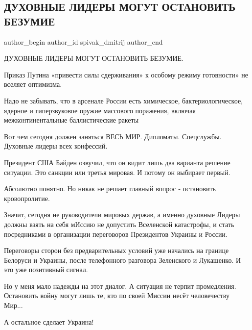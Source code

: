  
 
 
 
 
 
\subsection{ДУХОВНЫЕ ЛИДЕРЫ МОГУТ ОСТАНОВИТЬ БЕЗУМИЕ}
\label{sec:27_02_2022.fb.spivak_dmitrij.1.duhovnyje_lidery}
 
\ifcmt
 author_begin
   author_id spivak_dmitrij
 author_end
\fi

ДУХОВНЫЕ ЛИДЕРЫ МОГУТ ОСТАНОВИТЬ БЕЗУМИЕ. 

Приказ Путина «привести силы сдерживания» к особому режиму готовности» не
вселяет оптимизма. 

Надо не забывать, что в арсенале России есть химическое, бактериологическое,
ядерное и гиперзвуковое оружие массового поражения, включая межконтинентальные
баллистические ракеты 

Вот чем сегодня должен заняться ВЕСЬ МИР. Дипломаты. Спецслужбы. Духовные
лидеры всех конфессий. 

Президент США Байден озвучил, что он видит лишь два варианта решение ситуации.
Это санкции или третья мировая. И потому он выбирает первый. 

Абсолютно понятно. Но никак не решает главный вопрос - остановить
кровопролитие. 

Значит, сегодня не руководители мировых держав, а именно  духовные Лидеры
должны взять на себя мИссию не допустить Вселенской катастрофы, и стать
посредниками в организации переговоров Президентов Украины и России.

Переговоры сторон без предварительных условий уже начались на границе Белоруси
и Украины, после телефонного разговора Зеленского и Лукашенко. И это уже
позитивный сигнал. 

Но у меня мало надежды на этот диалог. А ситуация не терпит промедления.
Остановить войну могут лишь те, кто по своей Миссии несёт человечеству Мир...

А остальное сделает Украина!
